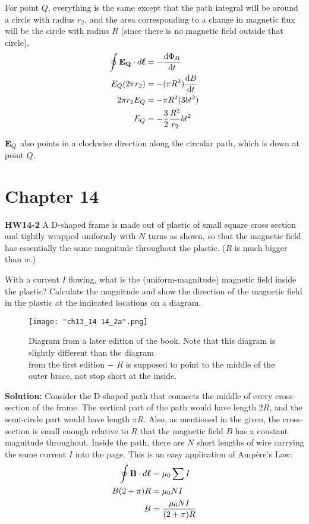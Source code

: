 \documentclass{article}
\begin{document}
For point $Q$, everything is the same except that the path integral will be around a circle with radius $r_2$, and the area corresponding to a change in magnetic flux will be the circle with radius $R$ (since there is no magnetic field outside that circle).
\begin{equation*}
\begin{aligned}
\oint\vb{E_Q}\cdot d\vb*{\ell} &= -\frac{\dd \Phi_B}{\dd t} \\
E_Q(2\pi r_2) &= -(\pi R^2)\frac{\dd B}{\dd t} \\
2\pi r_2E_Q &= -\pi R^2 (3bt^2) \\
E_Q &= -\frac{3}{2}\frac{R^2}{r_2}bt^2
\end{aligned}
\end{equation*}

$\vb{E}_Q$ also points in a clockwise direction along the circular path, which is down at point $Q$.
\pagebreak

\section*{Chapter 14}

\textbf{HW14-2} A D-shaped frame is made out of plastic of small square cross section and tightly wrapped uniformly with $N$ turns as shown, so that the magnetic field has essentially the same magnitude throughout the plastic. ($R$ is much bigger than $w$.)

With a current $I$ flowing, what is the (uniform-magnitude) magnetic field inside the plastic? Calculate the magnitude and show the direction of the magnetic field in the plastic at the indicated locations on a diagram.

\begin{figure}[H]
	\centering
	\texttt{[image: "ch13\_14 14\_2a".png]}
	\caption{Diagram from a later edition of the book. Note that this diagram is slightly different than the diagram\\from the first edition $-$ $R$ is supposed to point to the middle of the outer brace, not stop short at the inside.}
\end{figure}

\textbf{Solution:} Consider the D-shaped path that connects the middle of every cross-section of the frame. The vertical part of the path would have length $2R$, and the semi-circle part would have length $\pi R$. Also, as mentioned in the given, the cross-section is small enough relative to $R$ that the magnetic field $B$ has a constant magnitude throughout. Inside the path, there are $N$ short lengths of wire carrying the same current $I$ into the page. This is an easy application of Amp\`{e}re's Law:
\begin{equation*}
\begin{aligned}
\oint\vb{B}\cdot d\vb*{\ell} &= \mu_0\sum I \\
B(2+\pi)R &= \mu_0NI \\
B &= \frac{\mu_0NI}{(2+\pi)R}
\end{aligned}
\end{equation*}
\end{document}

